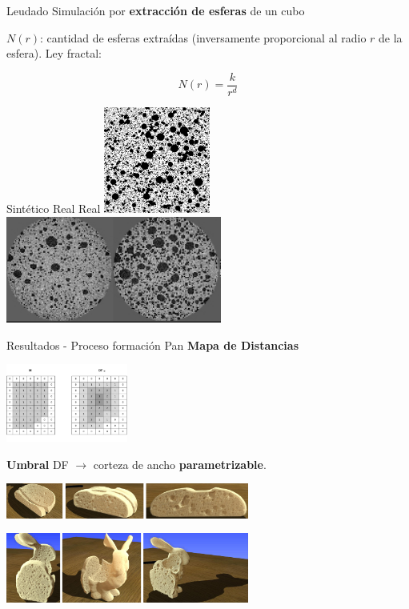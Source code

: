 \documentclass[spanish,unknownkeysallowed,10pt]{beamer}
\begin{document}
\begin{frame}{Leudado}
Simulación por \textbf{extracción de esferas} de un cubo

$N(r)$: cantidad de esferas extraídas (inversamente proporcional al radio $r$ de la esfera). Ley fractal:

\begin{equation*}
N(r) = \frac{k}{r^{d}}
\end{equation*}

\vspace{0.3cm}
Sintético \hspace{2.1cm} Real \hspace{2.6cm} Real
\centering
\includegraphics[height=3.5cm]{../figures/bubbles}
\includegraphics[height=3.5cm]{../figures/proving}

\end{frame}

\begin{frame}{Resultados - Proceso formación Pan}
\textbf{Mapa de Distancias}
\centerline{\includegraphics[width=4cm]{../figures/DistanceTransform}}

\textbf{Umbral} DF $\rightarrow$ corteza de ancho \textbf{parametrizable}.

\vspace{0.3cm}

\centerline{\includegraphics[width=8cm]{../figures/prebakebread}}

\centerline{\includegraphics[width=8cm]{../figures/prebakebunny}}
\end{frame}
\end{document}
